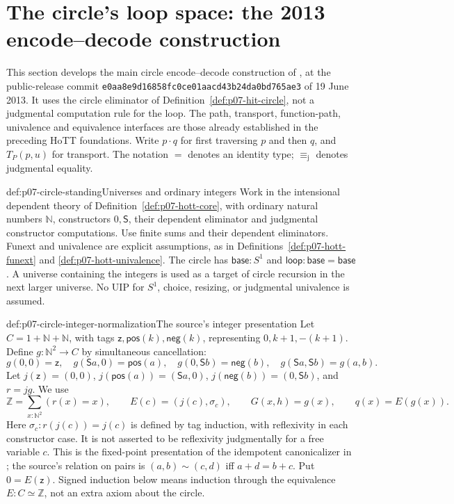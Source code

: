 \section{The circle's loop space: the 2013 encode--decode construction}
\label{sec:p07-hott-circle-encode-decode}

This section develops the main circle encode--decode construction of
\cite[\S8.1]{HoTT2013PublicReleaseFoundations},
at the public-release commit
\texttt{e0aa8e9d16858fc0ce01aacd43b24da0bd765ae3} of 19 June 2013.
It uses the circle eliminator of Definition~\ref{def:p07-hit-circle}, not a
judgmental computation rule for the loop. The path, transport, function-path,
univalence and equivalence interfaces are those already established in the
preceding HoTT foundations. Write \(p\cdot q\) for first traversing \(p\) and
then \(q\), and \(T_P(p,u)\) for transport. The notation \(=\) denotes an
identity type; \(\equiv_{\mathrm j}\) denotes judgmental equality.

\begin{hbconvention}{def:p07-circle-standing}{Universes and ordinary integers}
Work in the intensional dependent theory of
Definition~\ref{def:p07-hott-core}, with ordinary natural numbers
\(\mathbb N\), constructors \(0,\mathsf S\), their dependent eliminator and
judgmental constructor computations. Use finite sums and their dependent
eliminators. Funext and univalence are explicit assumptions, as in
Definitions~\ref{def:p07-hott-funext} and \ref{def:p07-hott-univalence}.
The circle has \(\mathsf{base}:S^1\) and
\(\mathsf{loop}:\mathsf{base}=\mathsf{base}\). A universe containing the
integers is used as a target of circle recursion in the next larger universe.
No UIP for \(S^1\), choice, resizing, or judgmental univalence is assumed.
\end{hbconvention}

\begin{hbdefinition}{def:p07-circle-integer-normalization}{The source's integer presentation}
Let \(C=1+\mathbb N+\mathbb N\), with tags
\(\mathsf z,\mathsf{pos}(k),\mathsf{neg}(k)\), representing \(0,k+1,-(k+1)\).
Define \(g:\mathbb N^2\to C\) by simultaneous cancellation:
\[
g(0,0)=\mathsf z,\quad g(\mathsf Sa,0)=\mathsf{pos}(a),\quad
g(0,\mathsf Sb)=\mathsf{neg}(b),\quad
g(\mathsf Sa,\mathsf Sb)=g(a,b).
\]
Let \(j(\mathsf z)=(0,0)\), \(j(\mathsf{pos}(a))=(\mathsf Sa,0)\),
\(j(\mathsf{neg}(b))=(0,\mathsf Sb)\), and \(r=jg\). We use
\[
\mathbb Z=\sum_{x:\mathbb N^2}(r(x)=x),\qquad
E(c)=(j(c),\sigma_c),\qquad G(x,h)=g(x),\qquad
q(x)=E(g(x)).
\]
Here \(\sigma_c:r(j(c))=j(c)\) is defined by tag induction, with
reflexivity in each constructor case. It is not asserted to be reflexivity
judgmentally for a free variable \(c\).
This is the fixed-point presentation of the idempotent canonicalizer in
\cite[\S6.10]{HoTT2013PublicReleaseFoundations}; the source's
relation on pairs is \((a,b)\sim(c,d)\) iff \(a+d=b+c\).
Put \(0=E(\mathsf z)\). Signed induction below means induction through
the equivalence \(E:C\simeq\mathbb Z\), not an extra axiom about the circle.
\end{hbdefinition}

